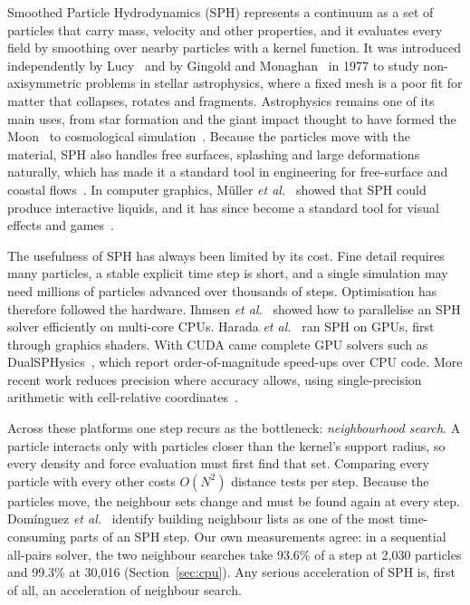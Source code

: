 \documentclass[conference]{IEEEtran}
\begin{document}
Smoothed Particle Hydrodynamics (SPH) represents a continuum as a set of particles that carry mass, velocity and other properties, and it evaluates every field by smoothing over nearby particles with a kernel function. It was introduced independently by Lucy~\cite{lucy1977} and by Gingold and Monaghan~\cite{gingold1977} in 1977 to study non-axisymmetric problems in stellar astrophysics, where a fixed mesh is a poor fit for matter that collapses, rotates and fragments. Astrophysics remains one of its main uses, from star formation and the giant impact thought to have formed the Moon~\cite{canup2001} to cosmological simulation~\cite{springel2010}. Because the particles move with the material, SPH also handles free surfaces, splashing and large deformations naturally, which has made it a standard tool in engineering for free-surface and coastal flows~\cite{crespo2015dualsphysics}. In computer graphics, M\"uller \emph{et al.}~\cite{muller2003particle} showed that SPH could produce interactive liquids, and it has since become a standard tool for visual effects and games~\cite{koschier2022survey}.

The usefulness of SPH has always been limited by its cost. Fine detail requires many particles, a stable explicit time step is short, and a single simulation may need millions of particles advanced over thousands of steps. Optimisation has therefore followed the hardware. Ihmsen \emph{et al.}~\cite{ihmsen2011parallel} showed how to parallelise an SPH solver efficiently on multi-core CPUs. Harada \emph{et al.}~\cite{harada2007sph} ran SPH on GPUs, first through graphics shaders. With CUDA came complete GPU solvers such as DualSPHysics~\cite{crespo2015dualsphysics}, which report order-of-magnitude speed-ups over CPU code. More recent work reduces precision where accuracy allows, using single-precision arithmetic with cell-relative coordinates~\cite{mao2024mixed}.

Across these platforms one step recurs as the bottleneck: \emph{neighbourhood search}. A particle interacts only with particles closer than the kernel's support radius, so every density and force evaluation must first find that set. Comparing every particle with every other costs $O(N^2)$ distance tests per step. Because the particles move, the neighbour sets change and must be found again at every step. Dom\'inguez \emph{et al.}~\cite{dominguez2011neighbour} identify building neighbour lists as one of the most time-consuming parts of an SPH step. Our own measurements agree: in a sequential all-pairs solver, the two neighbour searches take 93.6\% of a step at 2,030 particles and 99.3\% at 30,016 (Section~\ref{sec:cpu}). Any serious acceleration of SPH is, first of all, an acceleration of neighbour search.
\end{document}
